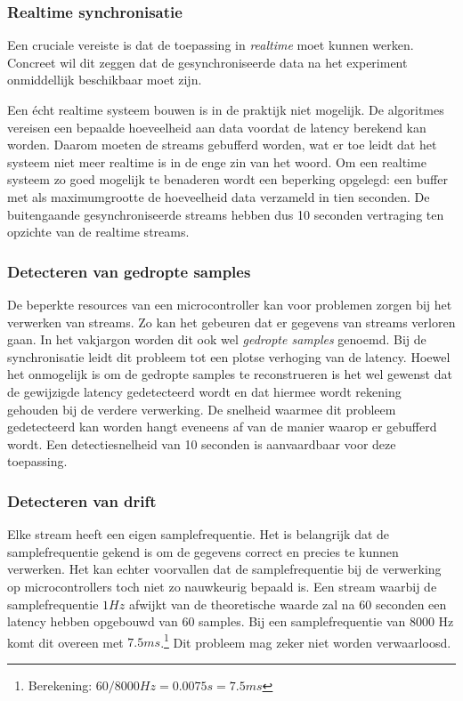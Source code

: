 \subsubsection{Realtime synchronisatie}

Een cruciale vereiste is dat de toepassing in \textit{realtime} moet kunnen werken. Concreet wil dit zeggen dat de gesynchroniseerde data na het experiment onmiddellijk beschikbaar moet zijn.

Een écht realtime systeem bouwen is in de praktijk niet mogelijk. De algoritmes vereisen een bepaalde hoeveelheid aan data voordat de latency berekend kan worden. Daarom moeten de streams gebufferd worden, wat er toe leidt dat het systeem niet meer realtime is in de enge zin van het woord. Om een realtime systeem zo goed mogelijk te benaderen wordt een beperking opgelegd: een buffer met als maximumgrootte de hoeveelheid data verzameld in tien seconden. De buitengaande gesynchroniseerde streams hebben dus 10 seconden vertraging ten opzichte van de realtime streams.

\subsubsection{Detecteren van gedropte samples}

De beperkte resources van een microcontroller kan voor problemen zorgen bij het verwerken van streams. Zo kan het gebeuren dat er gegevens van streams verloren gaan. In het vakjargon worden dit ook wel \textit{gedropte samples} genoemd. Bij de synchronisatie leidt dit probleem tot een plotse verhoging van de latency. Hoewel het onmogelijk is om de gedropte samples te reconstrueren is het wel gewenst dat de gewijzigde latency gedetecteerd wordt en dat hiermee wordt rekening gehouden bij de verdere verwerking. De snelheid waarmee dit probleem gedetecteerd kan worden hangt eveneens af van de manier waarop er gebufferd wordt. Een detectiesnelheid van 10 seconden is aanvaardbaar voor deze toepassing.

\subsubsection{Detecteren van drift}

Elke stream heeft een eigen samplefrequentie. Het is belangrijk dat de samplefrequentie gekend is om de gegevens correct en precies te kunnen verwerken. Het kan echter voorvallen dat de samplefrequentie bij de verwerking op microcontrollers toch niet zo nauwkeurig bepaald is. Een stream waarbij de samplefrequentie $ 1Hz $ afwijkt van de theoretische waarde zal na 60 seconden een latency hebben opgebouwd van 60 samples. Bij een samplefrequentie van 8000 Hz komt dit overeen met $7.5 ms$.\footnote{Berekening: $ 60 / 8000 Hz = 0.0075 s = 7.5 ms $} Dit probleem mag zeker niet worden verwaarloosd. 

